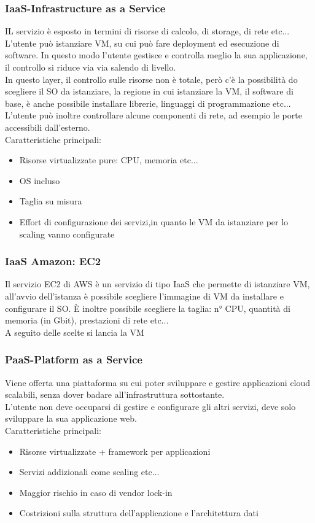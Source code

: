 \documentclass{article}
\begin{document}
\subsubsection{IaaS-Infrastructure as a Service}
IL servizio è esposto in termini di risorse di calcolo, di storage, di rete etc... L'utente può istanziare VM, su cui può fare deployment ed esecuzione di software. In questo modo l'utente gestisce e controlla meglio la sua applicazione, il controllo si riduce via via salendo di livello.\\ In questo layer, il controllo sulle risorse non è totale, però c'è la possibilità do scegliere il SO da istanziare, la regione in cui istanziare la VM, il software di base, è anche possibile installare librerie, linguaggi di programmazione etc... L'utente può inoltre controllare alcune componenti di rete, ad esempio le porte accessibili dall'esterno.\\ Caratteristiche principali:
\begin{itemize}
\item Risorse virtualizzate pure: CPU, memoria etc...
\item OS incluso
\item Taglia su misura
\item Effort di configurazione dei servizi,in quanto le VM da istanziare per lo scaling vanno configurate
\end{itemize}
\subsubsection{IaaS Amazon: EC2}
Il servizio EC2 di AWS è un servizio di tipo IaaS che permette di istanziare VM, all'avvio dell'istanza è possibile scegliere l'immagine di VM da installare e configurare il SO. È inoltre possibile scegliere la taglia: n° CPU, quantità di memoria (in Gbit), prestazioni di rete etc...\\ A seguito delle scelte si lancia la VM
\subsubsection{PaaS-Platform as a Service}
Viene offerta una piattaforma su cui poter sviluppare e gestire applicazioni cloud scalabili, senza dover badare all'infrastruttura sottostante.\\ L'utente non deve occuparsi di gestire e configurare gli altri servizi, deve solo sviluppare la sua applicazione web.\\ Caratteristiche principali:
\begin{itemize}
\item Risorse virtualizzate + framework per applicazioni
\item Servizi addizionali come scaling etc...
\item Maggior rischio in caso di vendor lock-in
\item Costrizioni sulla struttura dell'applicazione e l'architettura dati
\end{itemize}
\end{document}
